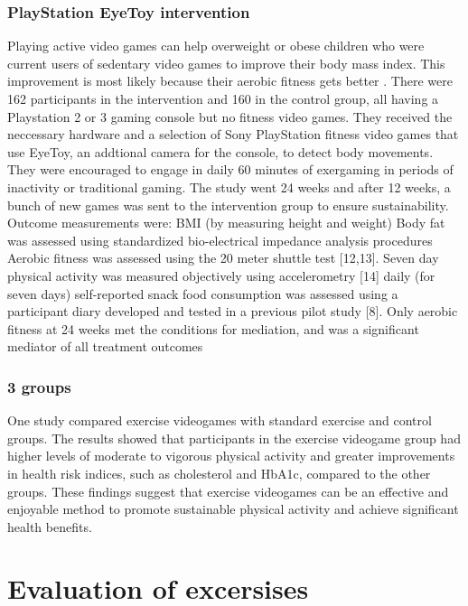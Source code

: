 \subsubsection{PlayStation EyeToy intervention}
Playing active video games can help overweight or obese children who were current users of sedentary video games to improve their body mass index. This improvement is most likely because their aerobic fitness gets better \cite{maddison12avg}. There were 162 participants in the intervention and 160 in the control group, all having a Playstation 2 or 3 gaming console but no fitness video games. They received the neccessary hardware and a selection of Sony PlayStation fitness video games that use EyeToy, an addtional camera for the console, to detect body movements. They were encouraged to engage in daily 60 minutes of exergaming in periods of inactivity or traditional gaming. The study went 24 weeks and after 12 weeks, a bunch of new games was sent to the intervention group to ensure sustainability.
Outcome measurements were:
BMI (by measuring height and weight)
Body fat was assessed using standardized bio-electrical impedance analysis procedures
Aerobic fitness was assessed using the 20 meter shuttle test [12,13].
Seven day physical activity was measured objectively using accelerometry [14]
daily (for seven days) self-reported snack food consumption was assessed using a participant diary developed and tested in a previous pilot study [8].
Only aerobic fitness at 24 weeks met the conditions for mediation, and was a significant mediator of all treatment outcomes

\subsubsection{3 groups}
One study \cite{bock2019exercise} compared exercise videogames with standard exercise and control groups. The results showed that participants in the exercise videogame group had higher levels of moderate to vigorous physical activity and greater improvements in health risk indices, such as cholesterol and HbA1c, compared to the other groups. These findings suggest that exercise videogames can be an effective and enjoyable method to promote sustainable physical activity and achieve significant health benefits.

\section{Evaluation of excersises}


